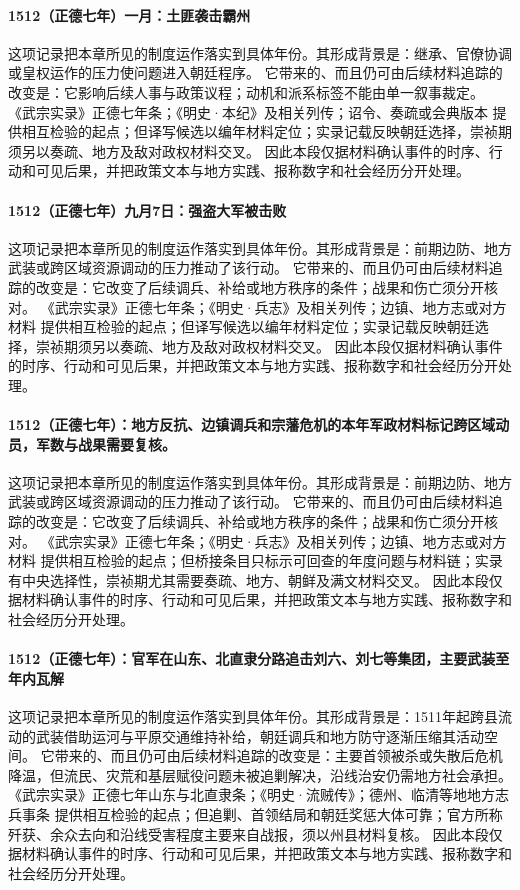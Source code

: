 \paragraph{1512（正德七年）一月：土匪袭击霸州} 这项记录把本章所见的制度运作落实到具体年份。其形成背景是：继承、官僚协调或皇权运作的压力使问题进入朝廷程序。 它带来的、而且仍可由后续材料追踪的改变是：它影响后续人事与政策议程；动机和派系标签不能由单一叙事裁定。 《武宗实录》正德七年条；《明史·本纪》及相关列传；诏令、奏疏或会典版本 提供相互检验的起点；但译写候选以编年材料定位；实录记载反映朝廷选择，崇祯期须另以奏疏、地方及敌对政权材料交叉。 因此本段仅据材料确认事件的时序、行动和可见后果，并把政策文本与地方实践、报称数字和社会经历分开处理。

\paragraph{1512（正德七年）九月7日：强盗大军被击败} 这项记录把本章所见的制度运作落实到具体年份。其形成背景是：前期边防、地方武装或跨区域资源调动的压力推动了该行动。 它带来的、而且仍可由后续材料追踪的改变是：它改变了后续调兵、补给或地方秩序的条件；战果和伤亡须分开核对。 《武宗实录》正德七年条；《明史·兵志》及相关列传；边镇、地方志或对方材料 提供相互检验的起点；但译写候选以编年材料定位；实录记载反映朝廷选择，崇祯期须另以奏疏、地方及敌对政权材料交叉。 因此本段仅据材料确认事件的时序、行动和可见后果，并把政策文本与地方实践、报称数字和社会经历分开处理。

\paragraph{1512（正德七年）：地方反抗、边镇调兵和宗藩危机的本年军政材料标记跨区域动员，军数与战果需要复核。} 这项记录把本章所见的制度运作落实到具体年份。其形成背景是：前期边防、地方武装或跨区域资源调动的压力推动了该行动。 它带来的、而且仍可由后续材料追踪的改变是：它改变了后续调兵、补给或地方秩序的条件；战果和伤亡须分开核对。 《武宗实录》正德七年条；《明史·兵志》及相关列传；边镇、地方志或对方材料 提供相互检验的起点；但桥接条目只标示可回查的年度问题与材料链；实录有中央选择性，崇祯期尤其需要奏疏、地方、朝鲜及满文材料交叉。 因此本段仅据材料确认事件的时序、行动和可见后果，并把政策文本与地方实践、报称数字和社会经历分开处理。

\paragraph{1512（正德七年）：官军在山东、北直隶分路追击刘六、刘七等集团，主要武装至年内瓦解} 这项记录把本章所见的制度运作落实到具体年份。其形成背景是：1511年起跨县流动的武装借助运河与平原交通维持补给，朝廷调兵和地方防守逐渐压缩其活动空间。 它带来的、而且仍可由后续材料追踪的改变是：主要首领被杀或失散后危机降温，但流民、灾荒和基层赋役问题未被追剿解决，沿线治安仍需地方社会承担。 《武宗实录》正德七年山东与北直隶条；《明史·流贼传》；德州、临清等地地方志兵事条 提供相互检验的起点；但追剿、首领结局和朝廷奖惩大体可靠；官方所称歼获、余众去向和沿线受害程度主要来自战报，须以州县材料复核。 因此本段仅据材料确认事件的时序、行动和可见后果，并把政策文本与地方实践、报称数字和社会经历分开处理。

